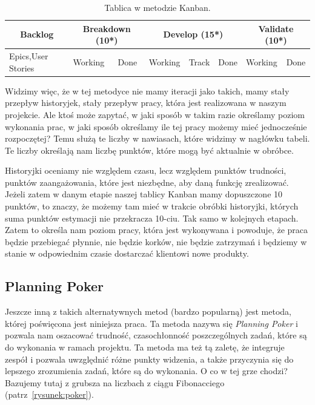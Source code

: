 \begin{table}
	\centering\caption{Tablica w metodzie Kanban.}\label{tabela:kanban}
	\begin{tabular}{*8{l} }%
	\toprule
	\multicolumn{1}{|c|}{\textbf{Backlog}} &\multicolumn{2}{|c|}{\textbf{Breakdown (10*)}} & \multicolumn{3}{|c|}{\textbf{Develop (15*)}} & \multicolumn{2}{|c|}{\textbf{Validate (10*)}} \\
	\midrule
	Epics,User Stories & Working
	& Done & Working & Track & Done & Working & Done \\
	\bottomrule
	\end{tabular}
\end{table}

Widzimy więc, że w tej metodyce nie mamy iteracji jako takich, mamy stały przepływ historyjek,
stały przepływ pracy, która jest realizowana w naszym projekcie.
Ale ktoś może zapytać, w jaki sposób w takim razie określamy poziom wykonania prac, w jaki sposób określamy
ile tej pracy możemy mieć jednocześnie rozpoczętej?
Temu służą te liczby w nawiasach, które widzimy w nagłówku tabeli.
Te liczby określają nam liczbę punktów, które mogą być aktualnie w obróbce.

Historyjki oceniamy nie względem czasu, lecz względem punktów trudności,
punktów zaangażowania, które jest niezbędne, aby daną funkcję zrealizować.
Jeżeli zatem w danym etapie naszej tablicy Kanban mamy dopuszczone 10 punktów,
to znaczy, że możemy tam mieć w trakcie obróbki historyjki,
których suma punktów estymacji nie przekracza 10-ciu. Tak samo w kolejnych etapach.
Zatem to określa nam poziom pracy, która jest wykonywana i powoduje, że praca będzie przebiegać płynnie,
nie będzie korków, nie będzie zatrzymań i będziemy w stanie w odpowiednim czasie dostarczać klientowi
nowe produkty.\cite{Toyota}

\subsection{Planning Poker}

Jeszcze inną z takich alternatywnych metod (bardzo popularną) jest metoda,
której poświęcona jest niniejsza praca.
Ta metoda nazywa się \textit{Planning Poker} i pozwala nam oszacować trudność,
czasochłonność poszczególnych zadań, które są do wykonania w ramach projektu.
Ta metoda ma też tą zaletę, że integruje zespół i pozwala uwzględnić różne punkty widzenia,
a także przyczynia się do lepszego zrozumienia zadań, które są do wykonania.
O co w tej grze chodzi? Bazujemy tutaj z grubsza na liczbach z ciągu Fibonacciego (patrz~\ref{rysunek:poker}).

